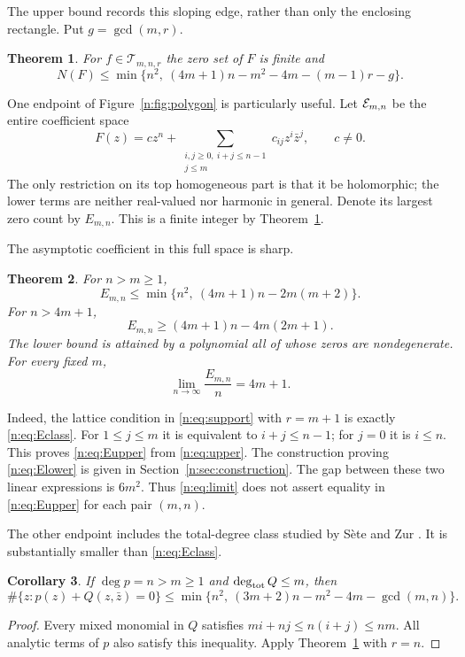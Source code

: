 \documentclass[UTF8,11pt]{ctexart}
\newtheorem{thm}{Theorem}[section]
\newtheorem{cor}[thm]{Corollary}
\theoremstyle{definition}
\numberwithin{equation}{section}
\newcommand{\Tcal}{\mathcal T}\newcommand{\Ccal}{\mathcal C}
\begin{document}
The upper bound records this sloping edge, rather than only the enclosing
rectangle. Put $g=\gcd(m,r)$.
\begin{thm}\label{n:thm:polygon}
For $f\in\Tcal_{m,n,r}$ the zero set of $F$ is finite and
\begin{equation}\label{n:eq:upper}
 N(F)\le\min\{n^2,\ (4m+1)n-m^2-4m-(m-1)r-g\}.
\end{equation}
\end{thm}

One endpoint of Figure~\ref{n:fig:polygon} is particularly useful. Let
$\mathcal E_{m,n}$ be the entire coefficient space
\begin{equation}\label{n:eq:Eclass}
 F(z)=c z^n+
 \sum_{\substack{i,j\ge0,\ i+j\le n-1\\j\le m}}c_{ij}z^i\bar z^j,
 \qquad c\ne0.
\end{equation}
The only restriction on its top homogeneous part is that it be holomorphic;
the lower terms are neither real-valued nor harmonic in general. Denote its
largest zero count by $E_{m,n}$. This is a finite integer by
Theorem~\ref{n:thm:polygon}.

The asymptotic coefficient in this full space is sharp.
\begin{thm}\label{n:thm:E}
For $n>m\ge1$,
\begin{equation}\label{n:eq:Eupper}
 E_{m,n}\le\min\{n^2,\ (4m+1)n-2m(m+2)\}.
\end{equation}
For $n>4m+1$,
\begin{equation}\label{n:eq:Elower}
 E_{m,n}\ge(4m+1)n-4m(2m+1).
\end{equation}
The lower bound is attained by a polynomial all of whose zeros are
nondegenerate. For every fixed $m$,
\begin{equation}\label{n:eq:limit}
 \lim_{n\to\infty}\frac{E_{m,n}}n=4m+1.
\end{equation}
\end{thm}

Indeed, the lattice condition in \eqref{n:eq:support} with $r=m+1$ is exactly
\eqref{n:eq:Eclass}. For $1\le j\le m$ it is equivalent to $i+j\le n-1$;
for $j=0$ it is $i\le n$. This proves \eqref{n:eq:Eupper} from
\eqref{n:eq:upper}. The construction proving \eqref{n:eq:Elower} is given in
Section~\ref{n:sec:construction}. The gap between these two linear expressions
is $6m^2$. Thus \eqref{n:eq:limit} does not assert equality in
\eqref{n:eq:Eupper} for each pair $(m,n)$.

The other endpoint includes the total-degree class studied by S\`ete and Zur
\cite[Section~5]{SZ24}. It is substantially smaller than \eqref{n:eq:Eclass}.
\begin{cor}\label{n:cor:total}
If $\deg p=n>m\ge1$ and $\deg_{\rm tot}Q\le m$, then
\begin{equation}\label{n:eq:total}
 \#\{z:p(z)+Q(z,\bar z)=0\}
 \le\min\{n^2,\ (3m+2)n-m^2-4m-\gcd(m,n)\}.
\end{equation}
\end{cor}
\begin{proof}
Every mixed monomial in $Q$ satisfies
$mi+nj\le n(i+j)\le nm$. All analytic terms of $p$ also satisfy this
inequality. Apply Theorem~\ref{n:thm:polygon} with $r=n$.
\end{proof}
\end{document}

